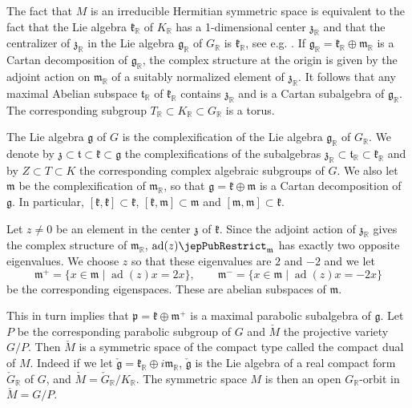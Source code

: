 The fact that $M$ is an irreducible Hermitian symmetric space is equivalent to the fact that the Lie algebra $\mathfrak k_{\mathbb R}$ of $K_{\mathbb R}$ has a 1-dimensional center $\mathfrak z_{\mathbb R}$ and that the centralizer of $\mathfrak z_{\mathbb R}$ in the Lie algebra $\mathfrak g_{\mathbb R}$ of $G_{\mathbb R}$ is $\mathfrak k_{\mathbb R}$, see e.g. \cite{jep93Kna02}. If $\mathfrak g_{\mathbb R}=\mathfrak k_{\mathbb R}\oplus\mathfrak m_{\mathbb R}$ is a Cartan decomposition of $\mathfrak g_{\mathbb R}$, the complex structure at the origin is given by the adjoint action on $\mathfrak m_{\mathbb R}$ of a suitably normalized element of $\mathfrak z_{\mathbb R}$. It follows that any maximal Abelian subspace $\mathfrak t_{\mathbb R}$ of $\mathfrak k_{\mathbb R}$ contains $\mathfrak z_{\mathbb R}$ and is a Cartan subalgebra of $\mathfrak g_{\mathbb R}$. The corresponding subgroup $T_{\mathbb R}\subset K_{\mathbb R}\subset G_{\mathbb R}$ is a torus.

The Lie algebra $\mathfrak g$ of $G$ is the complexification of the Lie algebra $\mathfrak g_{\mathbb R}$ of $G_{\mathbb R}$. We denote by $\mathfrak z\subset\mathfrak t\subset\mathfrak k\subset\mathfrak g$ the complexifications of the subalgebras $\mathfrak z_{\mathbb R}\subset\mathfrak t_{\mathbb R}\subset\mathfrak k_{\mathbb R}$ and by $Z\subset T\subset K$ the corresponding complex algebraic subgroups of $G$. We also let $\mathfrak m$ be the complexification of $\mathfrak m_{\mathbb R}$, so that $\mathfrak g=\mathfrak k\oplus\mathfrak m$ is a Cartan decomposition of $\mathfrak g$. In particular, $[\mathfrak k,\mathfrak k]\subset\mathfrak k$, $[\mathfrak k,\mathfrak m]\subset\mathfrak m$ and $[\mathfrak m,\mathfrak m]\subset\mathfrak k$.

Let $z\neq0$ be an element in the center $\mathfrak z$ of $\mathfrak k$. Since the adjoint action of $\mathfrak z_{\mathbb R}$ gives the complex structure of $\mathfrak m_{\mathbb R}$, $\operatorname{ad}(z)\jepPubRestrict_{\mathfrak m}$ has exactly two opposite eigenvalues. We choose $z$ so that these eigenvalues are $2$ and $-2$ and we let
\[
\mathfrak m^+=\{x\in\mathfrak m\mid\operatorname{ad}(z)x=2x\},\qquad
\mathfrak m^-=\{x\in\mathfrak m\mid\operatorname{ad}(z)x=-2x\}
\]
be the corresponding eigenspaces. These are abelian subspaces of $\mathfrak m$.

This in turn implies that $\mathfrak p=\mathfrak k\oplus\mathfrak m^+$ is a maximal parabolic subalgebra of $\mathfrak g$. Let $P$ be the corresponding parabolic subgroup of $G$ and $\check M$ the projective variety $G/P$. Then $\check M$ is a symmetric space of the compact type called the compact dual of $M$. Indeed if we let $\check{\mathfrak g}=\mathfrak k_{\mathbb R}\oplus i\mathfrak m_{\mathbb R}$, $\check{\mathfrak g}$ is the Lie algebra of a real compact form $\check G_{\mathbb R}$ of $G$, and $\check M=\check G_{\mathbb R}/K_{\mathbb R}$. The symmetric space $M$ is then an open $G_{\mathbb R}$-orbit in $\check M=G/P$.

